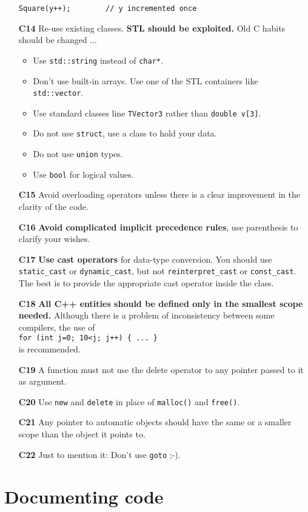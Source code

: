 \documentclass[a4paper,10pt]{article}
\begin{document}
\begin{itemize}
\begin{verbatim}
Square(y++);        // y incremented once
  \end{verbatim}
\item[\bf C14] Re-use existing classes. {\bf STL should be exploited.} Old
  C habits should be changed ...
  \begin{itemize}
    \item Use {\tt std::string} instead of {\tt char*}.
    \item Don't use built-in arrays. Use one of the STL containers like
          {\tt std::vector}.
    \item Use standard classes line {\tt TVector3} rather than {\tt double v[3]}.
    \item Do not use {\tt struct}, use a class to hold your data.
    \item Do not use {\tt union} types.
    \item Use {\tt bool} for logical values.
  \end{itemize}
\item[\bf C15] Avoid overloading operators unless there is a clear improvement
  in the clarity of the code.
\item[\bf C16] {\bf Avoid complicated implicit precedence rules}, use parenthesis
  to clarify your wishes.
\item[\bf C17] {\bf Use cast operators} for data-type conversion. You should use
  {\tt static\_cast} or {\tt dynamic\_cast}, but not {\tt reinterpret\_cast} or
  {\tt const\_cast}. The best is to provide the appropriate cast operator inside
  the class.
\item[\bf C18] {\bf All C++ entities should be defined only in the smallest
    scope needed.} Although there is a problem of inconsistency between some
  compilers, the use of\\
  {\tt for (int j=0; 10<j; j++) \{ ... \}}\\
  is recommended.
\item[\bf C19] A function must not use the delete operator to any pointer
  passed to it as argument.
\item[\bf C20] Use {\tt new} and {\tt delete} in place of {\tt malloc()} and
  {\tt free()}.
\item[\bf C21] Any pointer to automatic objects should have the same or a
  smaller scope than the object it points to.
\item[\bf C22] Just to mention it: Don't use {\tt goto} ;-).
\end{itemize}

\section{Documenting code}
\end{document}
